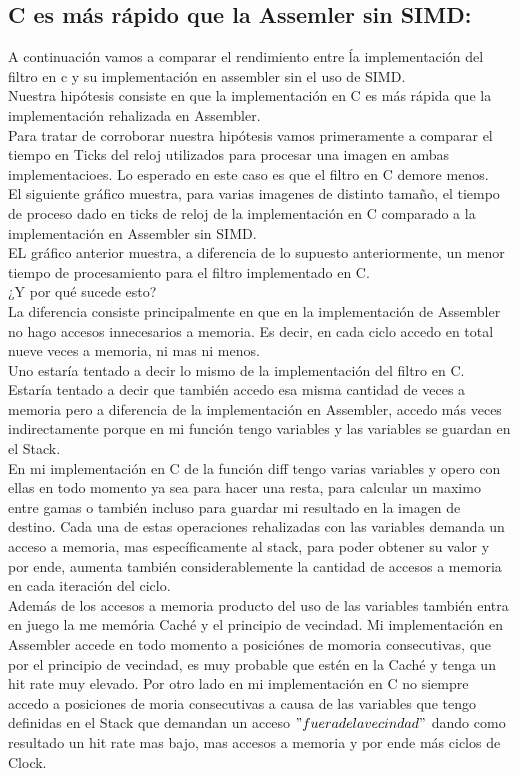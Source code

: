 \subsection{C es más rápido que la Assemler sin SIMD:}
 A continuación vamos a comparar el rendimiento entre ĺa implementación del filtro en c y su implementación en assembler sin el uso de SIMD.\\
 Nuestra hipótesis consiste en que la implementación en C es más rápida que la implementación rehalizada en Assembler.\\
 Para tratar de corroborar nuestra hipótesis vamos primeramente a comparar el tiempo en Ticks del reloj utilizados para procesar una imagen en ambas implementacioes.  Lo esperado en este caso es que el filtro en C demore menos. \\ 
 El siguiente gráfico muestra, para varias imagenes de distinto tamaño, el tiempo de proceso dado en ticks de reloj de la implementación en C comparado a la implementación en Assembler sin SIMD. \\
EL gráfico anterior muestra, a diferencia de lo supuesto anteriormente, un menor tiempo de procesamiento para el filtro implementado en C.\\
¿Y por qué sucede esto?\\
La diferencia consiste principalmente en que en la implementación de Assembler no hago accesos innecesarios a memoria. Es decir, en cada ciclo accedo en total nueve veces a memoria, ni mas ni menos.\\
 Uno estaría tentado a decir lo mismo de la implementación del filtro en C. Estaría tentado a decir que también accedo esa misma cantidad de veces a memoria pero a diferencia de la implementación en Assembler, accedo más veces indirectamente porque en mi función tengo variables y las variables se guardan en el Stack.\\
 En mi implementación en C de la función diff tengo varias variables y opero con ellas en todo momento ya sea para hacer una resta, para calcular un maximo entre gamas o también incluso para guardar mi resultado en la imagen de destino. Cada una de estas operaciones rehalizadas con las variables demanda un acceso a memoria, mas específicamente al stack, para poder obtener su valor y por ende, aumenta también considerablemente la cantidad de accesos a memoria en cada iteración del ciclo.\\
 Además de los accesos a memoria producto del uso de las variables también entra en juego la me memória Caché y el principio de vecindad. Mi implementación en Assembler accede en todo momento a posiciónes de momoria consecutivas, que por el principio de vecindad, es muy probable que estén en la Caché y tenga un hit rate muy elevado.  Por otro lado en mi implementación en C no siempre accedo a posiciones de moria consecutivas a causa de las variables que tengo definidas en el Stack que demandan un acceso $"fuera de la vecindad"$ dando como resultado un hit rate mas bajo, mas accesos a memoria y por ende más ciclos de Clock.\\

  
 





